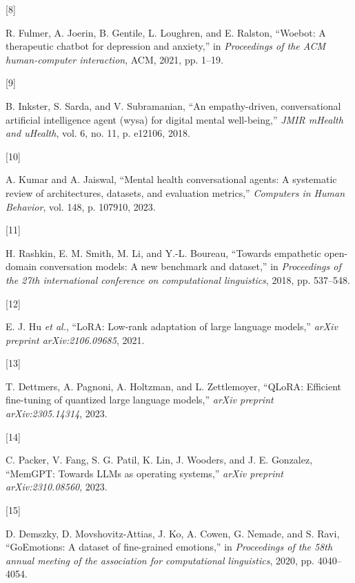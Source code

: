 \documentclass[
  letterpaper,
  12pt,
  a4paper,
  openany]{report}
\newlength{\cslhangindent}
\newlength{\csllabelwidth}
\newenvironment{CSLReferences}[2] %
 {\begin{list}{}{%
  \setlength{\itemindent}{0pt}
  \setlength{\leftmargin}{0pt}
  \setlength{\parsep}{0pt}
  \ifodd #1
   \setlength{\leftmargin}{\cslhangindent}
   \setlength{\itemindent}{-1\cslhangindent}
  \fi
  \setlength{\itemsep}{#2\baselineskip}}}
 {\end{list}}
\newcommand{\CSLLeftMargin}[1]{\parbox[t]{\csllabelwidth}{\strut#1\strut}}
\newcommand{\CSLRightInline}[1]{\parbox[t]{\linewidth - \csllabelwidth}{\strut#1\strut}}
\begin{document}
\begin{CSLReferences}{0}{0}
\CSLLeftMargin{{[}8{]} }%
\CSLRightInline{R. Fulmer, A. Joerin, B. Gentile, L. Loughren, and E.
Ralston, {``Woebot: A therapeutic chatbot for depression and anxiety,''}
in \emph{Proceedings of the ACM human-computer interaction}, ACM, 2021,
pp. 1--19.}

\CSLLeftMargin{{[}9{]} }%
\CSLRightInline{B. Inkster, S. Sarda, and V. Subramanian, {``An
empathy-driven, conversational artificial intelligence agent (wysa) for
digital mental well-being,''} \emph{JMIR mHealth and uHealth}, vol. 6,
no. 11, p. e12106, 2018.}

\CSLLeftMargin{{[}10{]} }%
\CSLRightInline{A. Kumar and A. Jaiswal, {``Mental health conversational
agents: A systematic review of architectures, datasets, and evaluation
metrics,''} \emph{Computers in Human Behavior}, vol. 148, p. 107910,
2023.}

\CSLLeftMargin{{[}11{]} }%
\CSLRightInline{H. Rashkin, E. M. Smith, M. Li, and Y.-L. Boureau,
{``Towards empathetic open-domain conversation models: A new benchmark
and dataset,''} in \emph{Proceedings of the 27th international
conference on computational linguistics}, 2018, pp. 537--548.}

\CSLLeftMargin{{[}12{]} }%
\CSLRightInline{E. J. Hu \emph{et al.}, {``LoRA: Low-rank adaptation of
large language models,''} \emph{arXiv preprint arXiv:2106.09685}, 2021.}

\CSLLeftMargin{{[}13{]} }%
\CSLRightInline{T. Dettmers, A. Pagnoni, A. Holtzman, and L.
Zettlemoyer, {``{QLoRA}: Efficient fine-tuning of quantized large
language models,''} \emph{arXiv preprint arXiv:2305.14314}, 2023.}

\CSLLeftMargin{{[}14{]} }%
\CSLRightInline{C. Packer, V. Fang, S. G. Patil, K. Lin, J. Wooders, and
J. E. Gonzalez, {``{MemGPT}: Towards {LLMs} as operating systems,''}
\emph{arXiv preprint arXiv:2310.08560}, 2023.}

\CSLLeftMargin{{[}15{]} }%
\CSLRightInline{D. Demszky, D. Movshovitz-Attias, J. Ko, A. Cowen, G.
Nemade, and S. Ravi, {``{GoEmotions}: A dataset of fine-grained
emotions,''} in \emph{Proceedings of the 58th annual meeting of the
association for computational linguistics}, 2020, pp. 4040--4054.}


\end{CSLReferences}
\end{document}
